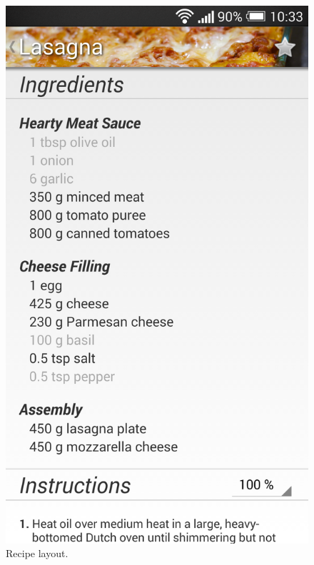 \begin{figure}[H]
\begin{minipage}[t]{0.5\columnwidth}
\centering
\includegraphics[width=0.7\columnwidth]{img/screenshots/finalrecipe2.png}
\caption{Recipe layout\label{fig:recipe2}.}
\end{minipage}
\hspace{0.5cm}
\begin{minipage}[t]{0.5\columnwidth}
\centering

\end{minipage}
\end{figure}
